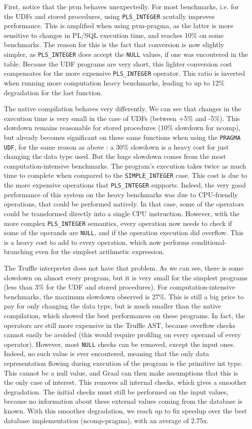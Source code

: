 \documentclass[twoside,11pt,a4paper]{article}
\newcommand{\java}[1]{\textsf{#1}}
\newcommand{\pls}[1]{\small\texttt{#1}\normalsize}
\newcommand{\plstype}[1]{\pls{#1}}
\newcommand{\plsi}{\plstype{PLS\_INTEGER}}
\newcommand{\simpleint}{\plstype{SIMPLE\_INTEGER}}
\newcommand{\plsnull}{\pls{NULL}}
\newcommand{\benchsystem}[1]{\textsf{#1}}
\newcommand{\pvm}{\benchsystem{pvm}}
\newcommand{\pvmg}{\benchsystem{pvm-pragma}}
\newcommand{\ncomp}{\benchsystem{ncomp}}
\newcommand{\ncpg}{\benchsystem{ncomp-pragma}}
\begin{document}
First, notice that the \pvm{} behaves unexpectedly. For most benchmarks, i.e. for the UDFs and stored procedures, using \plsi{} acutally improves performance. This is amplified when using \pvmg{}, as the latter is more sensitive to changes in PL/SQL execution time, and reaches 10\% on some benchmarks. The reason for this is the fact that conversion is now slightly simpler, as \plsi{} does accept the \plsnull{} values, if one was encoutered in the table. Because the UDF programs are very short, this lighter conversion cost compensates for the more expensive \plsi{} operator. This ratio is inverted when running more computation heavy benchmarks, leading to up to 12\% degradation for the last function.

The native compilation behaves very differently. We can see that changes in the execution time is very small in the case of UDFs (between +5\% and -5\%). This slowdown remains reasonable for stored procedures (10\% slowdown for \ncomp{}), but already becomes significant on these same functions when using the \pls{PRAGMA UDF}, for the same reason as above : a 30\% slowdown is a heavy cost for just changing the data type used. But the huge slowdown comes from the most computation-intensive benchmarks. The program's execution takes twice as much time to complete when compared to the \simpleint{} case. This cost is due to the more expensive operations that \plsi{} supports. Indeed, the very good performance of this system on the heavy benchmarks was due to CPU-friendly operations, that could be performed natively. In that case, some of the operators could be transformed directly into a single CPU instruction. However, with the more complex \plsi{} semantics, every operation now needs to check if some of the operands are \plsnull{}, and if the operation execution did overflow. This is a heavy cost to add to every operation, which now performs conditional-branching even for the simplest arithmetic expression.

The Truffle interpreter does not have that problem. As we can see, there is some slowdown on almost every program, but it is very small for the simplest programs (less than 3\% for the UDF and stored procedures). For computation-intensive benchmarks, the maximum slowdown observed is 27\%. This is still a big price to pay for only changing the data type, but is much smaller than the native compilation, which showed the best performances on these programs. In fact, the operators are still more expensive in the Truffle AST, because overflow checks cannot easily be avoided (this would require profiling on every operand of every operator). However, most \plsnull{} checks can be removed, except the input ones. Indeed, no such value is ever encoutered, meaning that the only data representation flowing during execution of the program is the primitive \java{int} type. This cannot be a null value, and Graal can then make assumptions that this is the only case of interest. This removes all internal checks, which gives a smoother degradation. The initial checks must still be performed on the input values, because no information about these external values coming from the database is known. With this smoother degradation, we reach up to 6x speedup over the best database implementation (\ncpg{}), with an average of 2.75x.
\end{document}
